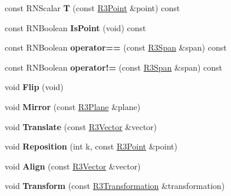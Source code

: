 \begin{DoxyCompactItemize}
\item 
const R\+N\+Scalar {\bfseries T} (const \hyperlink{class_r3_point}{R3\+Point} \&point) const \hypertarget{class_r3_span_ae5cd9ffa29772cf28e12183a544851b4}{}\label{class_r3_span_ae5cd9ffa29772cf28e12183a544851b4}

\item 
const R\+N\+Boolean {\bfseries Is\+Point} (void) const \hypertarget{class_r3_span_af83fa881cbe0eefc4f424e6e50c64e20}{}\label{class_r3_span_af83fa881cbe0eefc4f424e6e50c64e20}

\item 
const R\+N\+Boolean {\bfseries operator==} (const \hyperlink{class_r3_span}{R3\+Span} \&span) const \hypertarget{class_r3_span_a07595b5315b11a7a808d68d30c23f9a1}{}\label{class_r3_span_a07595b5315b11a7a808d68d30c23f9a1}

\item 
const R\+N\+Boolean {\bfseries operator!=} (const \hyperlink{class_r3_span}{R3\+Span} \&span) const \hypertarget{class_r3_span_a48293f15ba254f957b114233847727f3}{}\label{class_r3_span_a48293f15ba254f957b114233847727f3}

\item 
void {\bfseries Flip} (void)\hypertarget{class_r3_span_a84d35cbbbff9a38cee9f6f4d272fca68}{}\label{class_r3_span_a84d35cbbbff9a38cee9f6f4d272fca68}

\item 
void {\bfseries Mirror} (const \hyperlink{class_r3_plane}{R3\+Plane} \&plane)\hypertarget{class_r3_span_a9d54987bc3760e31fd0103cf6947f84d}{}\label{class_r3_span_a9d54987bc3760e31fd0103cf6947f84d}

\item 
void {\bfseries Translate} (const \hyperlink{class_r3_vector}{R3\+Vector} \&vector)\hypertarget{class_r3_span_a60ba97b071b5fb4518f1624d4b2c7f5f}{}\label{class_r3_span_a60ba97b071b5fb4518f1624d4b2c7f5f}

\item 
void {\bfseries Reposition} (int k, const \hyperlink{class_r3_point}{R3\+Point} \&point)\hypertarget{class_r3_span_a62b4fbe8c1e5120dbce8c9d4cc9a0a15}{}\label{class_r3_span_a62b4fbe8c1e5120dbce8c9d4cc9a0a15}

\item 
void {\bfseries Align} (const \hyperlink{class_r3_vector}{R3\+Vector} \&vector)\hypertarget{class_r3_span_a3daf9e992ab12d9d424cdd3b4e9821ca}{}\label{class_r3_span_a3daf9e992ab12d9d424cdd3b4e9821ca}

\item 
void {\bfseries Transform} (const \hyperlink{class_r3_transformation}{R3\+Transformation} \&transformation)\hypertarget{class_r3_span_ab0e85677f78f12fbd1a1c3c0a17f066e}{}\label{class_r3_span_ab0e85677f78f12fbd1a1c3c0a17f066e}


\end{DoxyCompactItemize}
